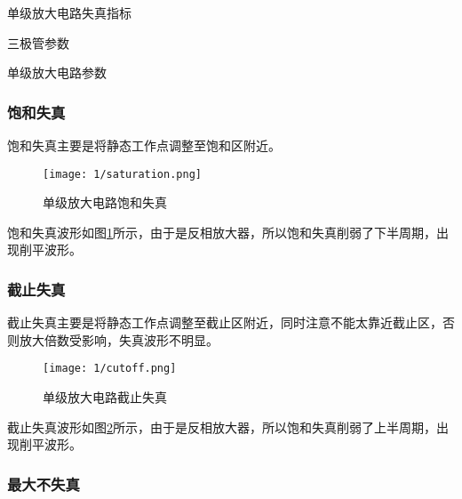 \begin{table}[H]
	\centering
	\caption{单级放大电路失真指标}
	\label{tab:单级放大电路失真指标}
\end{table}

\begin{table}[H]
	\centering
	\caption{三极管参数}
	\label{tab:三极管参数}
\end{table}

\begin{table}[H]
	\centering
	\caption{单级放大电路参数}
	\label{tab:单级放大电路参数}
\end{table}

\subsubsection{饱和失真}%
\label{ssub:饱和失真}

饱和失真主要是将静态工作点调整至饱和区附近。

\begin{figure}[H]
	\centering
	\texttt{[image: 1/saturation.png]}
	\caption{单级放大电路饱和失真}
	\label{fig:单级放大电路饱和失真}
\end{figure}

饱和失真波形如图\ref{fig:单级放大电路饱和失真}所示，由于是反相放大器，所以饱和失真削弱了下半周期，出现削平波形。

\subsubsection{截止失真}%
\label{ssub:截止失真}

截止失真主要是将静态工作点调整至截止区附近，同时注意不能太靠近截止区，否则放大倍数受影响，失真波形不明显。

\begin{figure}[H]
	\centering
	\texttt{[image: 1/cutoff.png]}
	\caption{单级放大电路截止失真}
	\label{fig:单级放大电路截止失真}
\end{figure}

截止失真波形如图\ref{fig:单级放大电路截止失真}所示，由于是反相放大器，所以饱和失真削弱了上半周期，出现削平波形。

\subsubsection{最大不失真}%
\label{ssub:最大不失真}

